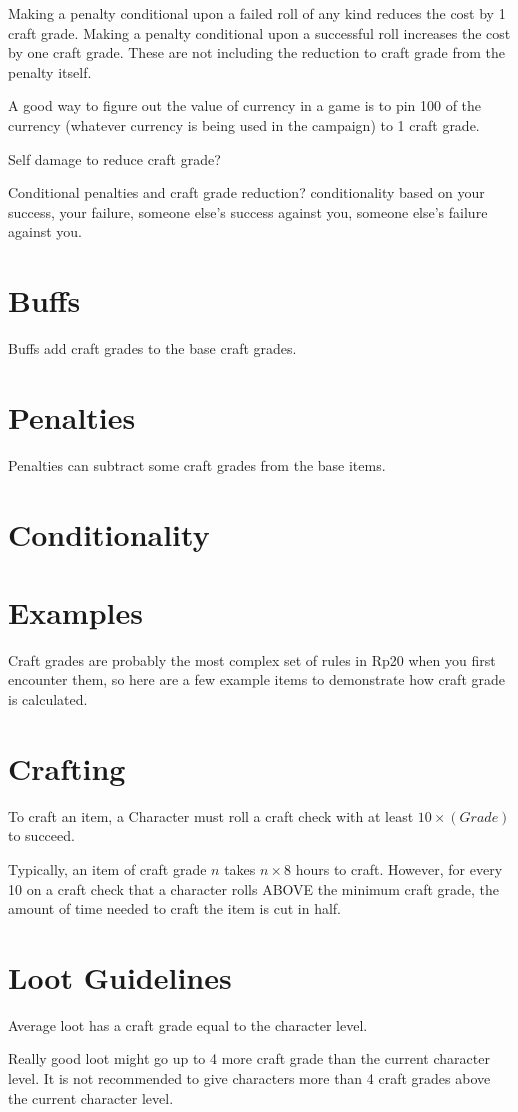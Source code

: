 Making a penalty conditional upon a failed roll of any kind reduces the cost by 1 craft grade. Making a penalty conditional upon a successful roll increases the cost by one craft grade. These are not including the reduction to craft grade from the penalty itself.

A good way to figure out the value of currency in a game is to pin 100 of the currency (whatever currency is being used in the campaign) to 1 craft grade.

Self damage to reduce craft grade?

Conditional penalties and craft grade reduction?
conditionality based on your success, your failure, someone else's success against you, someone else's failure against you.

\section{Buffs}
Buffs add craft grades to the base craft grades.

\section{Penalties}
Penalties can subtract some craft grades from the base items.

\section{Conditionality}

\section{Examples}
Craft grades are probably the most complex set of rules in Rp20 when you first encounter them, so here are a few example items to demonstrate how craft grade is calculated.

\section{Crafting}
To craft an item, a Character must roll a craft check with at least $10 \times (Grade)$ to succeed.

Typically, an item of craft grade $n$ takes $n \times 8$ hours to craft. However, for every 10 on a craft check that a character rolls ABOVE the minimum craft grade, the amount of time needed to craft the item is cut in half.

\section{Loot Guidelines}
Average loot has a craft grade equal to the character level.

Really good loot might go up to 4 more craft grade than the current character level. It is not recommended to give characters more than 4 craft grades above the current character level.
